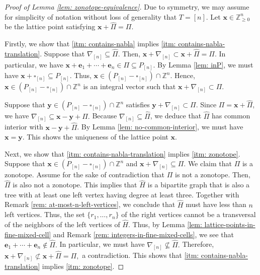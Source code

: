 \documentclass[12pt,reqno]{article}%
\theoremstyle{definition}
\numberwithin{equation}{section}
\newcommand{\bbe}{\mathbf{e}}
\newcommand{\bbx}{\mathbf{x}}
\newcommand{\bby}{\mathbf{y}}
\newcommand{\Z}{\mathbb Z}
\begin{document}
\begin{proof}[Proof of Lemma \ref{lem: zonotope-equivalence}] Due to symmetry, we may assume for simplicity of notation without loss of generality that $T = [n]$. Let $\bbx \in \Z^n_{\geq 0}$ be the lattice point satisfying $\bbx+ \hat{\Pi} = \Pi$.

Firstly, we show that \eqref{itm: contains-nabla} implies \eqref{itm: contains-nabla-translation}. Suppose that $\nabla_{[n]} \subseteq\hat{\Pi}.$ Then, $\bbx + \nabla_{[n]} \subset \bbx + \hat{\Pi} = \Pi.$ In particular, we have $\bbx + \bbe_1 + \cdots + \bbe_n \in \Pi \subseteq P_{[n]}$. By Lemma \ref{lem: inP}, we must have $\bbx + \square_{[n]} \subseteq P_{[n]}.$ Thus, $\bbx \in (P_{[n]} - \square_{[n]})\cap\Z^n.$ Hence, $\bbx \in (P_{[n]} - \square_{[n]})\cap\Z^n$ is an integral vector such that $\bbx + \nabla_{[n]} \subset \Pi$.

Suppose that $\bby \in (P_{[n]} - \square_{[n]})\cap\Z^n$ satisfies $\bby + \nabla_{[n]} \subset \Pi.$ Since $\Pi = \bbx + \hat{\Pi}$, we have $\nabla_{[n]} \subseteq \bbx - \bby + \hat{\Pi}.$ Because $\nabla_{[n]} \subseteq\hat{\Pi}$, we deduce that $\hat{\Pi}$ has common interior with $\bbx - \bby + \hat{\Pi}$. By Lemma \ref{lem: no-common-interior}, we must have $\bbx = \bby.$ This shows the uniqueness of the lattice point $\bbx$.

Next, we show that \eqref{itm: contains-nabla-translation} implies \eqref{itm: zonotope}. Suppose that $\bbx \in (P_{[n]}-\square_{[n]})\cap\Z^n$ and $\bbx + \nabla_{[n]}\subseteq \Pi$. We claim that $\Pi$ is a zonotope. Assume for the sake of contradiction that $\Pi$ is not a zonotope. Then, $\hat{\Pi}$ is also not a zonotope. This implies that $\hat{H}$ is a bipartite graph that is also a tree with at least one left vertex having degree at least three. Together with Remark \ref{rem: at-most-n-left-vertices}, we conclude that $\hat{H}$ must have less than $n$ left vertices. Thus, the set $\{r_{1},\dots, r_{n}\}$ of the right vertices cannot be a transversal of the neighbors of the left vertices of $\hat{H}.$ Thus, by Lemma \ref{lem: lattice-points-in-fine-mixed-cell} and Remark \ref{rem: integers-in-fine-mixed-cells}, we see that $\bbe_1 + \cdots + \bbe_n \not\in \hat{\Pi}.$ In particular, we must have $\nabla_{[n]} \not\subseteq \hat{\Pi}.$ Therefore, $\bbx + \nabla_{[n]} \not\subset  \bbx + \hat{\Pi} = \Pi,$ a contradiction. This shows that \eqref{itm: contains-nabla-translation} implies \eqref{itm: zonotope}.


\end{proof}
\end{document}
